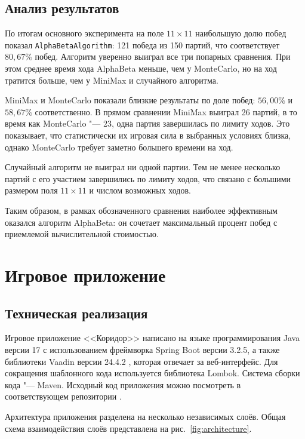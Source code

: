 \documentclass[a4paper,12pt]{diplom}
\begin{document}
\section{Анализ результатов}

По итогам основного эксперимента на поле $11 \times 11$ наибольшую долю побед показал \texttt{AlphaBetaAlgorithm}: 121 победа из 150 партий, что соответствует $80{,}67\%$ побед. Алгоритм уверенно выиграл все три попарных сравнения. При этом среднее время хода AlphaBeta меньше, чем у MonteCarlo, но на ход тратится больше, чем у MiniMax и случайного алгоритма.

MiniMax и MonteCarlo показали близкие результаты по доле побед: $56{,}00\%$ и $58{,}67\%$ соответственно. В прямом сравнении MiniMax выиграл 26 партий, в то время как MonteCarlo "--- 23, одна партия завершилась по лимиту ходов. Это показывает, что статистически их игровая сила в выбранных условиях близка, однако MonteCarlo требует заметно большего времени на ход.

Случайный алгоритм не выиграл ни одной партии. Тем не менее несколько партий с его участием завершились по лимиту ходов, что связано с большими размером поля $11 \times 11$ и числом возможных ходов.

Таким образом, в рамках обозначенного сравнения наиболее эффективным оказался алгоритм AlphaBeta: он сочетает максимальный процент побед с приемлемой вычислительной стоимостью.

\chapter{Игровое приложение}

\section{Техническая реализация}

Игровое приложение <<Коридор>> написано на языке программирования Java версии 17 с использованием фреймворка Spring Boot версии 3.2.5, а также библиотеки Vaadin версии 24.4.2 \cite{vaadin}, которая отвечает за веб-интерфейс. Для сокращения шаблонного кода используется библиотека Lombok. Система сборки кода "--- Maven. Исходный код приложения можно посмотреть в соответствующем репозитории \cite{github}.

Архитектура приложения разделена на несколько независимых слоёв. Общая схема взаимодействия слоёв представлена на рис.~\ref{fig:architecture}.
\end{document}
